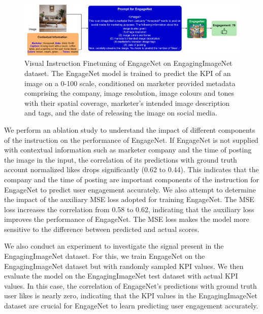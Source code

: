 \begin{figure}[!tb]
\centering
     \includegraphics[width=1\columnwidth]{images/boigllm_vift_compressed.pdf}
     \caption{\label{fig:EngageNet_training}
     Visual Instruction Finetuning of EngageNet on EngagingImageNet dataset. The EngageNet model is trained to predict the KPI of an image on a 0-100 scale, conditioned on marketer provided metadata comprising the company, image resolution, image colours and tones with their spatial coverage, marketer's intended image description and tags, and the date of releasing the image on social media.
     }
\end{figure}


 
We perform an ablation study to understand the impact of different components of the instruction on the performance of EngageNet. If EngageNet is not supplied with contextual information such as marketer company and the time of posting the image in the input, the correlation of its predictions with ground truth account normalized likes drops significantly (0.62 to 0.44). This indicates that the company and the time of posting are important components of the instruction for EngageNet to predict user engagement accurately.  We also attempt to determine the impact of the auxiliary MSE loss adopted for training EngageNet. The MSE loss increases the correlation from 0.58 to 0.62, indicating that the auxiliary loss improves the performance of EngageNet. The MSE loss makes the model more sensitive to the difference between predicted and actual scores. 

 
We also conduct an experiment to investigate the signal present in the EngagingImageNet dataset. For this, we train EngageNet on the EngagingImageNet dataset but with randomly sampled KPI values. We then evaluate the model on the EngagingImageNet test dataset with actual KPI values. In this case, the correlation of EngageNet's predictions with ground truth user likes is nearly zero, indicating that the KPI values in the EngagingImageNet dataset are crucial for EngageNet to learn predicting user engagement accurately. 
 
